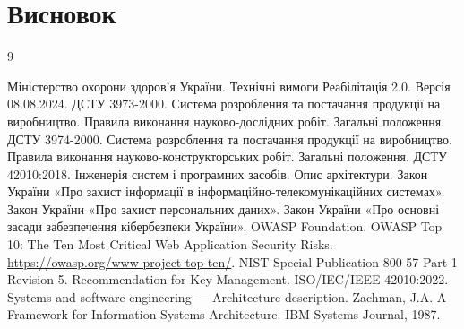 \documentclass{article}
\begin{document}
\newpage
\section*{Висновок}

\begin{thebibliography}{9}

 Міністерство охорони здоров’я України. \newblock Технічні вимоги Реабілітація 2.0. \newblock Версія 08.08.2024.
 ДСТУ 3973-2000. \newblock Система розроблення та постачання продукції на виробництво. Правила виконання науково-дослідних робіт. Загальні положення.
 ДСТУ 3974-2000. \newblock Система розроблення та постачання продукції на виробництво. Правила виконання науково-конструкторських робіт. Загальні положення.
 ДСТУ 42010:2018. \newblock Інженерія систем і програмних засобів. Опис архітектури.
 Закон України «Про захист інформації в інформаційно-телекомунікаційних системах».
 Закон України «Про захист персональних даних».
 Закон України «Про основні засади забезпечення кібербезпеки України».
 OWASP Foundation. \newblock OWASP Top 10: The Ten Most Critical Web Application Security Risks. \newblock \url{https://owasp.org/www-project-top-ten/}.
 NIST Special Publication 800-57 Part 1 Revision 5. \newblock Recommendation for Key Management.
 ISO/IEC/IEEE 42010:2022. \newblock Systems and software engineering — Architecture description.
 Zachman, J.A. \newblock A Framework for Information Systems Architecture. \newblock IBM Systems Journal, 1987.

\end{thebibliography}
\end{document}
